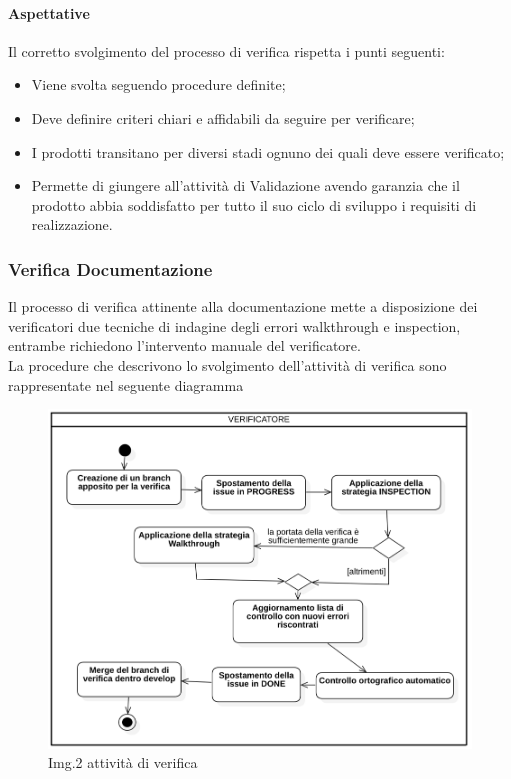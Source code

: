 			\paragraph{Aspettative}
				Il corretto svolgimento del processo di verifica rispetta i punti seguenti:\\
				\begin{itemize}
					\item  Viene svolta seguendo procedure definite;
					\item  Deve definire criteri chiari e affidabili da seguire per verificare;
					\item  I prodotti transitano per diversi stadi ognuno dei quali deve essere verificato;
					\item  Permette di giungere all’attività di Validazione avendo garanzia che il prodotto abbia soddisfatto per tutto il suo ciclo di sviluppo i requisiti di realizzazione.
				\end{itemize}
		\subsubsection{Verifica Documentazione}
			Il processo di verifica attinente alla documentazione mette a disposizione dei verificatori due tecniche di indagine degli errori walkthrough e inspection, entrambe richiedono l’intervento manuale del verificatore. \\
			La procedure che descrivono lo svolgimento dell’attività di verifica sono rappresentate nel seguente diagramma \\
			\begin{figure}[t!]
    				\centering
    				\includegraphics[width=1.0\textwidth]{res/images/verifica}
				\caption{Img.2 attività di verifica}
				\label{fig:Img.2 attività di verifica}
			\end{figure}
